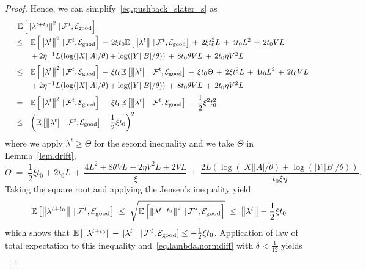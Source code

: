 \documentclass[12pt, final]{l4dc2023}
\begin{document}
\begin{proof}
	Hence, we can simplify~\eqref{eq.pushback_slater_s} as
	\[
	\begin{array}{rcl}
	&& \!\!\!\! \!\!\!\! \!\! 
	\mathbb{E} \sbr{ \norm{\lambda^{t+t_0}}^2 \,\vert\, \calF^{t}, \mathcal{E}_{\text{good}}}
	\\[0.2cm]
	& \leq & \displaystyle \mathbb{E} \sbr{ \norm{\lambda^{t}}^2\,\vert\, \calF^{t}, \mathcal{E}_{\text{good}}}
	\,-\,2\xi t_0 \mathbb{E} \sbr{ \norm{\lambda^t }\,\vert\, \calF^{t}, \mathcal{E}_{\text{good}}}
	\,+\,2 \xi t_0^2L
	\,+\,4t_0L^2
	\,+\, 2t_0 VL
	\\[0.2cm]
	&& \,+\, 2\eta^{-1} L(\log(|X||A|/\theta)+\log(|Y||B|/\theta))
	\,+\,8t_0\theta V L\,+\,2t_0\eta V^2 L
	\\[0.2cm]
	& \leq & \displaystyle \mathbb{E} \sbr{\norm{\lambda^{t}}^2\,\vert\, \calF^{t}, \mathcal{E}_{\text{good}}}
	\,-\,\xi t_0 \mathbb{E} \sbr{\norm{\lambda^t }\,\vert\, \calF^{t}, \mathcal{E}_{\text{good}}}
	\,-\,\xi t_0\Theta
	\,+\,2 \xi t_0^2L
	\,+\,4t_0L^2
	\,+\, 2t_0 VL
	\\[0.2cm]
	&& \,+\, 2\eta^{-1} L(\log(|X||A|/\theta)+\log(|Y||B|/\theta))
	\,+\,8t_0\theta V L\,+\,2t_0\eta V^2 L
	\\[0.2cm]
	& = & \displaystyle \mathbb{E} \sbr{\norm{\lambda^{t}}^2\,\vert\, \calF^{t}, \mathcal{E}_{\text{good}}}
	\,-\,\xi t_0 \mathbb{E} \sbr{\norm{\lambda^t}\,\vert\, \calF^{t}, \mathcal{E}_{\text{good}}} \,-\,\frac{1}{2} \xi^2 t_0^2
	\\[0.2cm]
	& \leq & \displaystyle
	\rbr{ \mathbb{E} \sbr{\norm{\lambda^{t}}\,\vert\, \calF^{t}, \mathcal{E}_{\text{good}}} - \frac{1}{2}\xi t_0 }^2
	\end{array}
	\]
	where we apply $\lambda^t\geq \Theta$ for the second inequality and we take $\Theta$ in Lemma~\ref{lem.drift},
	\[
	\Theta \;=\;
	\frac{1}{2}\xi t_0 +2 t_0L
	\,+\,\frac{4L^2 +8\theta V L+2\eta V^2 L
		+2 VL}{\xi}\,+\, \frac{2L(\log(|X||A|/\theta)+\log(|Y||B|/\theta)) }{t_0\xi\eta}.
	\]
	Taking the square root and applying the Jensen's inequality yield
	\[
	\mathbb{E} \left[ \left\|{ \lambda^{t+t_0}}\right\| \,\vert\, {\mathcal{F}}^{t}, \mathcal{E}_{\text{good}}\right]
	\;\leq\;
	\sqrt{\mathbb{E} \left[ \left\|{\lambda^{t+t_0}}\right\|^2 \,\vert\, {\mathcal{F}}^{t}, \mathcal{E}_{\text{good}}\right] }
	\;\leq\; 
	\left\|{\lambda^{t}}\right\| - \frac{1}{2}\xi t_0
	\]
	which shows that $\mathbb{E} \left[ \left\|{\lambda^{t+t_0}}\right\| - \left\|{\lambda^{t}}\right\|\,\vert\, {\mathcal{F}}^{t}, \mathcal{E}_{\text{good}} \right] \leq - \frac{1}{2}\xi t_0$. Application of law of total expectation to this inequality and~\eqref{eq.lambda.normdiff} with $\delta<\frac{1}{12}$ yields
	\[
	\begin{array}{rcl}

\end{array}\]
\end{proof}
\end{document}

